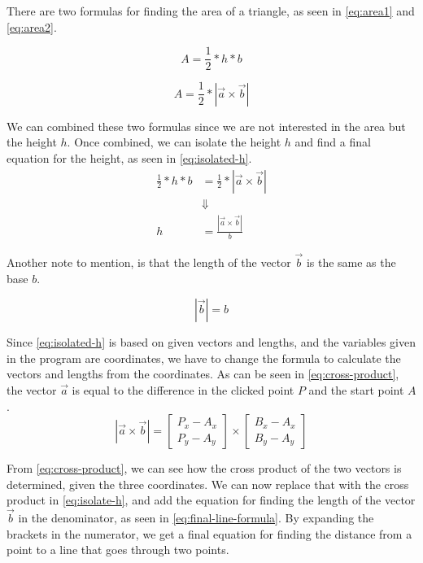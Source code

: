 There are two formulas for finding the area of a triangle, as seen in \eqref{eq:area1} and \eqref{eq:area2}.

\begin{equation}\label{eq:area1}
	A = \frac{1}{2}*h*b
\end{equation}

\begin{equation}\label{eq:area2}
	A =  \frac{1}{2}*|\vec{a} \times \vec{b}|
\end{equation}

We can combined these two formulas since we are not interested in the area but the height $h$.
Once combined, we can isolate the height $h$ and find a final equation for the height, as seen in \eqref{eq:isolated-h}.
\begin{equation}\label{eq:isolated-h}
\begin{aligned}
	\frac{1}{2}*h*b &=  \frac{1}{2}*|\vec{a} \times \vec{b}|\\
	& \Downarrow \\
	h &=  \frac{|\vec{a} \times \vec{b}|}{b}
\end{aligned}
\end{equation}

Another note to mention, is that the length of the vector $\vec{b}$ is the same as the base $b$.

\begin{equation*}
	|\vec{b}| = b
\end{equation*}

Since \eqref{eq:isolated-h} is based on given vectors and lengths, and the variables given in the program are coordinates, we have to change the formula to calculate the vectors and lengths from the coordinates.
As can be seen in \eqref{eq:cross-product}, the vector $\vec{a}$ is equal to the difference in the clicked point $P$ and the start point $A$.
\begin{equation}\label{eq:cross-product}
	|\vec{a} \times \vec{b}| = 
	\begin{bmatrix}
		P_x-A_x \\
		P_y-A_y
	\end{bmatrix}
	\times
	\begin{bmatrix}
		B_x-A_x \\
		B_y-A_y
	\end{bmatrix}
\end{equation}

From \eqref{eq:cross-product}, we can see how the cross product of the two vectors is determined, given the three coordinates.
We can now replace that with the cross product in \eqref{eq:isolate-h}, and add the equation for finding the length of the vector $\vec{b}$ in the denominator, as seen in \eqref{eq:final-line-formula}.
By expanding the brackets in the numerator, we get a final equation for finding the distance from a point to a line that goes through two points.

